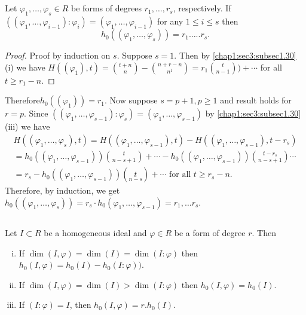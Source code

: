 \setcounter{subsection}{34}
\subsection{}\label{chap1:sec3:subsec1.35}
 
Let $\varphi_1,  \ldots, \varphi_s \in R$ be
  forms of degrees $r_1,  \ldots, r_s$, respectively. If\break $((\varphi_1,
  \ldots, \varphi_{i-1}):\varphi_i)=(\varphi_1,  \ldots,
  \varphi_{i-1})$ for any $1 \leq i \leq s$ then 
  $$
  h_0((\varphi_1,  \ldots, \varphi_s))= r_1 \ldots.. r_s.
  $$
\begin{proof}
  Proof by induction on $s$. Suppose $s=1$. Then by
  \ref{chap1:sec3:subsec1.30} (i) we have $
  H((\varphi_1),t)= \binom{t+n}{n} - \binom{n+r-n}{n^1}=r_1 \binom{t}{n-1})+
  \cdots$ for all $t \geq r_1 -n$. 
\end{proof}

Therefore\pageoriginale $h_0((\varphi_1))=r_1$. Now suppose $s = p+1,
p \geq 1$ and 
result holds for $r=p$. Since $((\varphi_1,  \ldots,
\varphi_{s-1}):\varphi_s)=(\varphi_1,  \ldots, \varphi_{s-1})$ by
\ref{chap1:sec3:subsec1.30} (iii) we have  
\begin{multline*}
  H((\varphi_1,  \ldots, \varphi_s),t)  = H((\varphi_1,  \ldots,
  \varphi_{s-1}),t)-H((\varphi_1,  \ldots, \varphi_{s-1}),t-r_s)\\ 
   = h_0((\varphi_1,  \ldots, \varphi_{s-1}))\binom{t}{n-s+1} +
  \cdots -h_0((\varphi_1,  \ldots, \varphi_{s-1}))
  \binom{t-r_s}{n-s+1} \cdots \\ 
  = r_s-h_0((\varphi_1,  \ldots, \varphi_{s-1}))(\underset{n-s}{t})+
  \cdots \text{ for all } t \geq r_s -n. 
\end{multline*}
Therefore, by induction, we get $h_0((\varphi_1,  \ldots,
\varphi_{s}))=r_s\cdot h_0 (\varphi_1,  \ldots, \varphi_{s-1}) = r_1,
\ldots r_s$. 

\setcounter{subsection}{35}
\subsection{}\label{chap1:sec3:subsec1.36}
Let $I \subset R$ be a homogeneous ideal and $\varphi \in R$
  be a form of degree $r$. Then 
\begin{enumerate}[(i)]
\item If $\dim (I,\varphi) = \dim (I) =\dim(I:  \varphi)$ then
  $ h_0( I, \varphi) = h_0(I) - h_0(I: \varphi))$. 
\item If $\dim (I,\varphi) = \dim (I)  > \dim(I:\varphi) $
  then $ h_0( I, \varphi) = h_0(I)$. 
\item If $(I:\varphi) = I$, then $h_0 (I, \varphi) = r. h_0(I)$. 
\end{enumerate}

